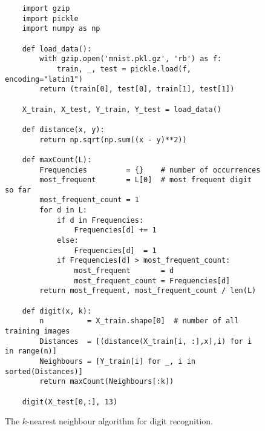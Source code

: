 \begin{figure}[!ht]
\centering
\begin{verbatim}
    import gzip
    import pickle
    import numpy as np

    def load_data():
        with gzip.open('mnist.pkl.gz', 'rb') as f:
            train, _, test = pickle.load(f, encoding="latin1")
        return (train[0], test[0], train[1], test[1])
        
    X_train, X_test, Y_train, Y_test = load_data()
        
    def distance(x, y):
        return np.sqrt(np.sum((x - y)**2))
    
    def maxCount(L):
        Frequencies         = {}    # number of occurrences 
        most_frequent       = L[0]  # most frequent digit so far
        most_frequent_count = 1     
        for d in L:
            if d in Frequencies:
                Frequencies[d] += 1
            else:
                Frequencies[d]  = 1
            if Frequencies[d] > most_frequent_count:
                most_frequent       = d
                most_frequent_count = Frequencies[d]
        return most_frequent, most_frequent_count / len(L)
    
    def digit(x, k):
        n          = X_train.shape[0]  # number of all training images
        Distances  = [(distance(X_train[i, :],x),i) for i in range(n)]
        Neighbours = [Y_train[i] for _, i in sorted(Distances)]
        return maxCount(Neighbours[:k])

    digit(X_test[0,:], 13)
\end{verbatim}
\vspace*{-0.3cm}
\caption{The $k$-nearest neighbour algorithm for digit recognition.}
\label{fig:Digit-Recognition.ipynb}
\end{figure}

